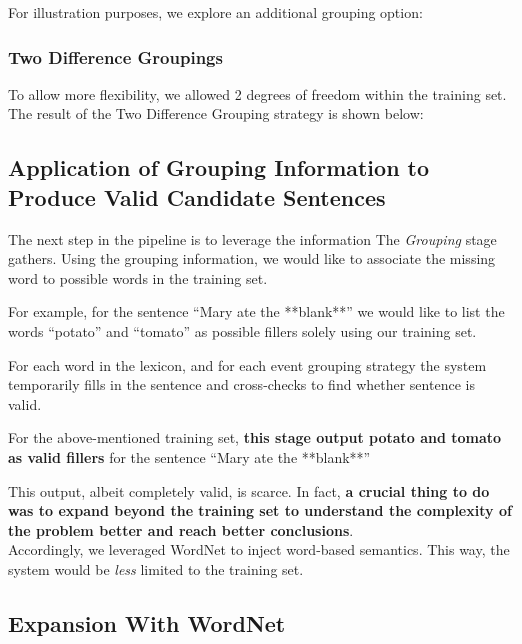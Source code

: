 \documentclass{article}[12pt]
\theoremstyle{definition}
\begin{document}
For illustration purposes, we explore an additional grouping option: 


\subsubsection{Two Difference Groupings}

To allow more flexibility, we allowed 2 degrees of freedom within the training set. The result of the Two Difference Grouping strategy is shown below: 


\begin{spverbatim}
\end{spverbatim}

\subsection{Application of Grouping Information to Produce Valid Candidate Sentences}

The next step in the pipeline is to leverage the information The \emph{Grouping} stage gathers. Using the grouping information, we would like to associate the missing word to possible words in the training set. 

For example, for the sentence ``Mary ate the **blank**'' we would like to list the words ``potato'' and ``tomato'' as possible fillers solely using our training set. 

For each word in the lexicon, and for each event grouping strategy the system temporarily fills in the sentence and cross-checks to find whether sentence is valid. 

For the above-mentioned training set, \textbf{this stage output potato and tomato as valid fillers} for the sentence ``Mary ate the **blank**''

This output, albeit completely valid, is scarce. In fact, \textbf{a crucial thing to do was to expand beyond the training set to understand the complexity of the problem better and reach better conclusions}.  \\

Accordingly, we leveraged WordNet to inject word-based semantics. This way, the system would be \emph{less} limited to the training set. \\ 

\subsection{Expansion With WordNet}
\end{document}
